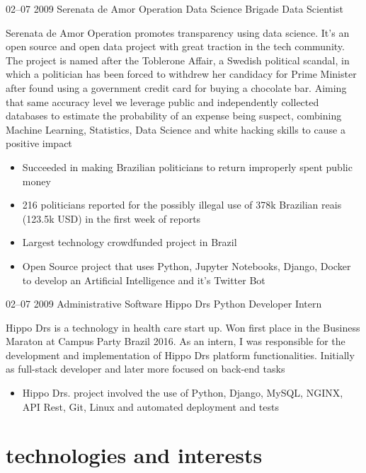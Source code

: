 \documentclass[]{friggeri-cv}
\begin{document}
\begin{entrylist}
  \entrysecondtype
    {02–07 2009}
    {Serenata de Amor Operation}
    {Data Science Brigade}
    {Data Scientist}
    {Serenata de Amor Operation promotes transparency using data science. It's an open source and open data project with great traction in the tech community. The project is named after the Toblerone Affair, a Swedish political scandal, in which a politician has been forced to withdrew her candidacy for Prime Minister after found using a government credit card for buying a chocolate bar. Aiming that same accuracy level we leverage public and independently collected databases to estimate the probability of an expense being suspect, combining Machine Learning, Statistics, Data Science and white hacking skills to cause a positive impact
      \begin{itemize}
        \item Succeeded in making Brazilian politicians to return improperly spent public money
        \item 216 politicians reported for the possibly illegal use of 378k Brazilian reais (123.5k USD) in the first week of reports
        \item Largest technology crowdfunded project in Brazil
        \item Open Source project that uses Python, Jupyter Notebooks, Django, Docker to develop an Artificial Intelligence and it's Twitter Bot
      \end{itemize}
    }
  \entrysecondtype
    {02–07 2009}
    {Administrative Software}
    {Hippo Drs}
    {Python Developer Intern}
    {Hippo Drs is a technology in health care start up. Won first place in the Business Maraton at Campus Party Brazil 2016. As an intern, I was responsible for the development and implementation of Hippo Drs platform functionalities. Initially as full-stack developer and later more focused on back-end tasks
      \begin{itemize}
        \item Hippo Drs. project involved the use of Python, Django, MySQL, NGINX, API Rest, Git, Linux and automated deployment and tests
      \end{itemize}
    }
\end{entrylist}

\section{technologies and interests}
\end{document}
